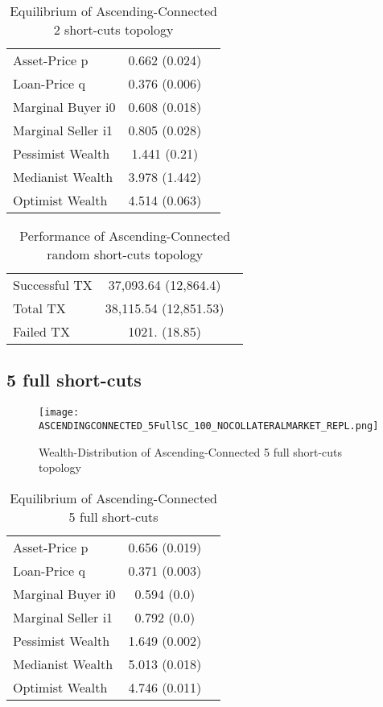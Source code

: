 \documentclass[Bachelorarbeit.tex]{subfiles}
\begin{document}
\begin{table}[H]
	\caption{Equilibrium of Ascending-Connected 2 short-cuts topology}
	\centering
	\begin{tabular} { l c r }
		\hline
		Asset-Price p & 0.662 (0.024) \\
		Loan-Price q & 0.376 (0.006) \\
		Marginal Buyer i0 & 0.608 (0.018) \\
		Marginal Seller i1 & 0.805 (0.028) \\
		\hline
		Pessimist Wealth & 1.441 (0.21) \\
		Medianist Wealth & 3.978 (1.442) \\
		Optimist Wealth & 4.514 (0.063) \\
		\hline
	\end{tabular}
\end{table} 

\begin{table}[H]
	\caption{Performance of Ascending-Connected random short-cuts topology}
	\centering
	\begin{tabular} { l c r }
		\hline
		Successful TX & 37,093.64 (12,864.4) \\
		Total TX & 38,115.54 (12,851.53) \\
		Failed TX & 1021. (18.85) \\
		\hline
	\end{tabular}
\end{table}

\subsection{5 full short-cuts}
\begin{figure}[H]
	\centering
  \texttt{[image: ASCENDINGCONNECTED\_5FullSC\_100\_NOCOLLATERALMARKET\_REPL.png]}
	\caption{Wealth-Distribution of Ascending-Connected 5 full short-cuts topology}
	\label{fig:wealth_ASCENDINGCONNECTED_5FullSC_100_NOCOLLATERALMARKET_REPL}
\end{figure}

\begin{table}[H]
	\caption{Equilibrium of Ascending-Connected 5 full short-cuts}
	\centering
	\begin{tabular} { l c r }
		\hline
		Asset-Price p & 0.656 (0.019) \\
		Loan-Price q & 0.371 (0.003) \\
		Marginal Buyer i0 & 0.594 (0.0) \\
		Marginal Seller i1 & 0.792 (0.0) \\
		\hline
		Pessimist Wealth & 1.649 (0.002) \\
		Medianist Wealth & 5.013 (0.018) \\
		Optimist Wealth & 4.746 (0.011) \\
		\hline
	\end{tabular}
\end{table} 
\end{document}
